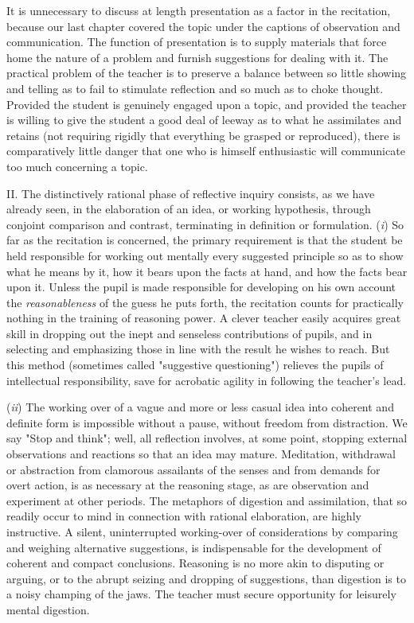 \documentclass[showtrims,ustradepaper]{memoir}
\begin{document}

It is unnecessary to discuss at length presentation as a factor in the
recitation, because our last chapter covered the topic under the
captions of observation and communication. The function of presentation
is to supply materials that force home the nature of a problem and
furnish suggestions for dealing with it. The practical problem of the
teacher is to preserve a balance between so little showing and telling
as to fail to stimulate reflection and so much as to choke thought.
Provided the student is genuinely engaged upon a topic, and provided the
teacher is willing to give the student a good deal of leeway as to what
he assimilates and retains (not requiring rigidly that everything be
grasped or
reproduced),
there is comparatively little danger that one who is himself
enthusiastic will communicate too much concerning a topic.


II. The distinctively rational phase of reflective inquiry consists, as
we have already seen, in the elaboration of an idea, or working
hypothesis, through conjoint comparison and contrast, terminating in
definition or formulation. (\emph{i}) So far as the recitation is
concerned, the primary requirement is that the student be held
responsible for working out mentally every suggested principle so as to
show what he means by it, how it bears upon the facts at hand, and how
the facts bear upon it. Unless the pupil is made responsible for
developing on his own account the \emph{reasonableness} of the guess he
puts forth, the recitation counts for practically nothing in the
training of reasoning power. A clever teacher easily acquires great
skill in dropping out the inept and senseless contributions of pupils,
and in selecting and emphasizing those in line with the result he wishes
to reach. But this method (sometimes called "suggestive questioning")
relieves the pupils of intellectual responsibility, save for acrobatic
agility in following the teacher's lead.


(\emph{ii}) The working over of a vague and more or less casual idea
into coherent and definite form is impossible without a pause, without
freedom from distraction. We say "Stop and think"; well, all reflection
involves, at some point, stopping external observations and reactions so
that an idea may mature. Meditation, withdrawal or abstraction from
clamorous assailants of the senses and from demands for overt action, is
as necessary at the reasoning stage, as are observation and experiment
at other periods. The metaphors of digestion
and
assimilation, that so readily occur to mind in connection with rational
elaboration, are highly instructive. A silent, uninterrupted
working-over of considerations by comparing and weighing alternative
suggestions, is indispensable for the development of coherent and
compact conclusions. Reasoning is no more akin to disputing or arguing,
or to the abrupt seizing and dropping of suggestions, than digestion is
to a noisy champing of the jaws. The teacher must secure opportunity for
leisurely mental digestion.
\end{document}
